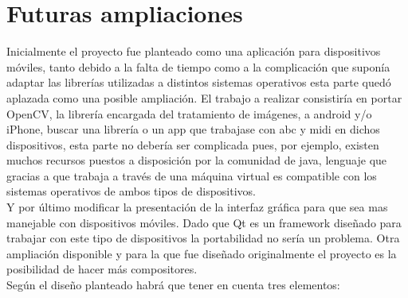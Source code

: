 \section{Futuras ampliaciones}

Inicialmente el proyecto fue planteado como una aplicación para dispositivos móviles, tanto debido a la falta de tiempo como a la complicación que suponía adaptar las librerías utilizadas a distintos sistemas operativos esta parte quedó aplazada como una posible ampliación.
\newline
El trabajo a realizar consistiría en portar OpenCV, la librería encargada del tratamiento de imágenes, a android y/o iPhone, buscar una librería o un app que trabajase con abc y midi en dichos dispositivos, esta parte no debería ser complicada pues, por ejemplo, existen muchos recursos puestos a disposición por la comunidad de java, lenguaje que gracias a que trabaja a través de una máquina virtual es compatible con los sistemas operativos de ambos tipos de dispositivos.
\\Y por último modificar la presentación de la interfaz gráfica para que sea mas manejable con dispositivos móviles. Dado que Qt es un framework diseñado para trabajar con este tipo de dispositivos la portabilidad no sería un problema.
\newline
Otra ampliación disponible y para la que fue diseñado originalmente el proyecto es la posibilidad de hacer más compositores.
\\Según el diseño planteado habrá que tener en cuenta tres elementos:
